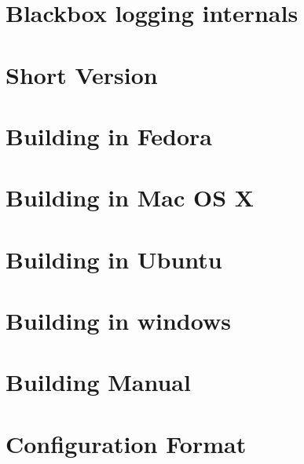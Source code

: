 \documentclass[twoside]{book}
\newcommand{\+}{\discretionary{\mbox{\scriptsize$\hookleftarrow$}}{}{}}
\begin{document}
\chapter{Blackbox logging internals}
\label{md_docs_development_Blackbox_Internals}
\hypertarget{md_docs_development_Blackbox_Internals}{}

\chapter{Short Version}
\label{md_docs_development_Building_in_Eclipse}
\hypertarget{md_docs_development_Building_in_Eclipse}{}

\chapter{Building in Fedora}
\label{md_docs_development_Building_in_Fedora}
\hypertarget{md_docs_development_Building_in_Fedora}{}

\chapter{Building in Mac O\+S X}
\label{md_docs_development_Building_in_Mac_OS_X}
\hypertarget{md_docs_development_Building_in_Mac_OS_X}{}

\chapter{Building in Ubuntu}
\label{md_docs_development_Building_in_Ubuntu}
\hypertarget{md_docs_development_Building_in_Ubuntu}{}

\chapter{Building in windows}
\label{md_docs_development_Building_in_Windows}
\hypertarget{md_docs_development_Building_in_Windows}{}

\chapter{Building Manual}
\label{md_docs_development_Building_Manual}
\hypertarget{md_docs_development_Building_Manual}{}

\chapter{Configuration Format}
\label{md_docs_development_Configuration_Format}
\hypertarget{md_docs_development_Configuration_Format}{}

\end{document}
